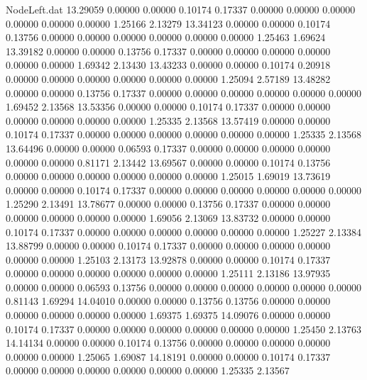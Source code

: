 \begin{filecontents}{NodeLeft.dat}
  13.29059    0.00000    0.00000     0.10174    0.17337    0.00000    0.00000    0.00000    0.00000    0.00000    0.00000    1.25166    2.13279
  13.34123    0.00000    0.00000     0.10174    0.13756    0.00000    0.00000    0.00000    0.00000    0.00000    0.00000    1.25463    1.69624
  13.39182    0.00000    0.00000     0.13756    0.17337    0.00000    0.00000    0.00000    0.00000    0.00000    0.00000    1.69342    2.13430
  13.43233    0.00000    0.00000     0.10174    0.20918    0.00000    0.00000    0.00000    0.00000    0.00000    0.00000    1.25094    2.57189
  13.48282    0.00000    0.00000     0.13756    0.17337    0.00000    0.00000    0.00000    0.00000    0.00000    0.00000    1.69452    2.13568
  13.53356    0.00000    0.00000     0.10174    0.17337    0.00000    0.00000    0.00000    0.00000    0.00000    0.00000    1.25335    2.13568
  13.57419    0.00000    0.00000     0.10174    0.17337    0.00000    0.00000    0.00000    0.00000    0.00000    0.00000    1.25335    2.13568
  13.64496    0.00000    0.00000     0.06593    0.17337    0.00000    0.00000    0.00000    0.00000    0.00000    0.00000    0.81171    2.13442
  13.69567    0.00000    0.00000     0.10174    0.13756    0.00000    0.00000    0.00000    0.00000    0.00000    0.00000    1.25015    1.69019
  13.73619    0.00000    0.00000     0.10174    0.17337    0.00000    0.00000    0.00000    0.00000    0.00000    0.00000    1.25290    2.13491
  13.78677    0.00000    0.00000     0.13756    0.17337    0.00000    0.00000    0.00000    0.00000    0.00000    0.00000    1.69056    2.13069
  13.83732    0.00000    0.00000     0.10174    0.17337    0.00000    0.00000    0.00000    0.00000    0.00000    0.00000    1.25227    2.13384
  13.88799    0.00000    0.00000     0.10174    0.17337    0.00000    0.00000    0.00000    0.00000    0.00000    0.00000    1.25103    2.13173
  13.92878    0.00000    0.00000     0.10174    0.17337    0.00000    0.00000    0.00000    0.00000    0.00000    0.00000    1.25111    2.13186
  13.97935    0.00000    0.00000     0.06593    0.13756    0.00000    0.00000    0.00000    0.00000    0.00000    0.00000    0.81143    1.69294
  14.04010    0.00000    0.00000     0.13756    0.13756    0.00000    0.00000    0.00000    0.00000    0.00000    0.00000    1.69375    1.69375
  14.09076    0.00000    0.00000     0.10174    0.17337    0.00000    0.00000    0.00000    0.00000    0.00000    0.00000    1.25450    2.13763
  14.14134    0.00000    0.00000     0.10174    0.13756    0.00000    0.00000    0.00000    0.00000    0.00000    0.00000    1.25065    1.69087
  14.18191    0.00000    0.00000     0.10174    0.17337    0.00000    0.00000    0.00000    0.00000    0.00000    0.00000    1.25335    2.13567

\end{filecontents}
